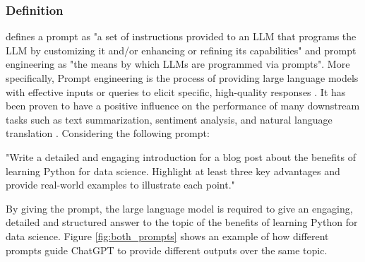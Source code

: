 \documentclass[runningheads]{llncs}
\begin{document}
\subsubsection{Definition}
\noindent \newline
\cite{LiuPengfei23} defines a prompt as "a set of instructions provided to an LLM that programs the LLM by customizing it and/or enhancing or refining its capabilities" and prompt engineering
as "the means by which LLMs are programmed via prompts". More specifically, Prompt engineering is the process of providing large language models with effective inputs or queries to elicit specific, high-quality responses \cite{Zhang24}.
It has been proven to have a positive influence on the performance of many downstream tasks such as text summarization, sentiment analysis,
and natural language translation \cite{Liu21}. Considering the following prompt:
\begin{example}
  "Write a detailed and engaging introduction for a blog post about the benefits of learning Python for data science. Highlight at least three key advantages and provide real-world examples to illustrate each point."
\end{example}
By giving the prompt, the large language model is required to give an engaging, detailed and structured answer to the topic of the benefits of learning Python for data science.
Figure \ref{fig:both_prompts} shows an example of how different prompts guide ChatGPT to provide different outputs over the same topic.
\end{document}
